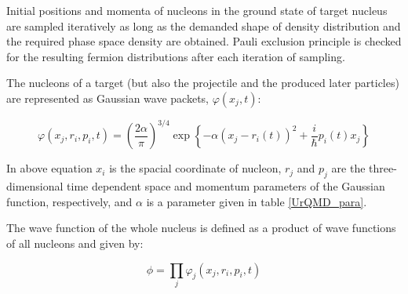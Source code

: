 

Initial positions and momenta of nucleons in the ground state of target nucleus are sampled iteratively as long as the demanded shape of density distribution and the required phase space density are obtained. 
Pauli exclusion principle is checked for the resulting fermion distributions after each iteration of sampling.

The nucleons of a target (but also the projectile and the produced later particles) are represented as Gaussian wave packets, $\varphi\left(x_j,t\right)$:


\begin{equation}
	\varphi\left(x_j,r_i,p_i,t\right)=\left(\frac{2\alpha}{\pi}\right)^{3/4}\exp\left\{-\alpha(x_j-r_i(t))^2+\frac{i}{\hbar}p_i(t)x_j\right\}
	\label{gaussUrQMD}
\end{equation}

In above equation 
$x_i$ is the spacial coordinate of nucleon, 
$r_j$ and $p_j$ are the three-dimensional time dependent space and momentum parameters of the Gaussian function, respectively,  
and $\alpha$ is a parameter given in table \ref{UrQMD_para}. 



The wave function of the whole nucleus is defined as a product of wave functions of all nucleons and given by:

\begin{equation}
	\phi=\prod_{j}\varphi_j(x_j,r_i,p_i,t)
\end{equation} 

